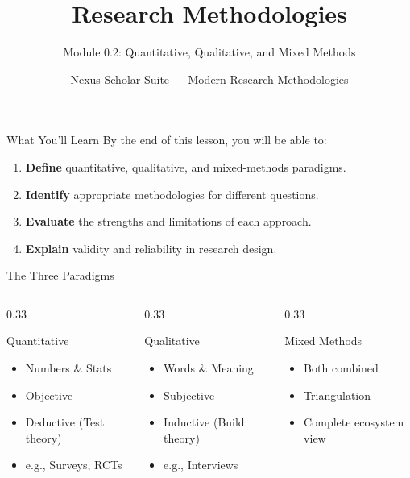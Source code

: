 \documentclass[aspectratio=169]{beamer}
\title{Research Methodologies}
\subtitle{Module 0.2: Quantitative, Qualitative, and Mixed Methods}
\author{Nexus Scholar Suite --- Modern Research Methodologies}
\date{}
\begin{document}
\begin{frame}[plain]
  \titlepage
\end{frame}

\begin{frame}{What You'll Learn}
  By the end of this lesson, you will be able to:
  \begin{enumerate}
    \item \textbf{Define} quantitative, qualitative, and mixed-methods paradigms.
    \item \textbf{Identify} appropriate methodologies for different questions.
    \item \textbf{Evaluate} the strengths and limitations of each approach.
    \item \textbf{Explain} validity and reliability in research design.
  \end{enumerate}
\end{frame}

\begin{frame}{The Three Paradigms}
  \begin{columns}[T]
    \begin{column}{0.33\textwidth}
      \begin{block}{Quantitative}
        \begin{itemize}
          \item Numbers \& Stats
          \item Objective
          \item Deductive (Test theory)
          \item e.g., Surveys, RCTs
        \end{itemize}
      \end{block}
    \end{column}
    \begin{column}{0.33\textwidth}
      \begin{exampleblock}{Qualitative}
        \begin{itemize}
          \item Words \& Meaning
          \item Subjective
          \item Inductive (Build theory)
          \item e.g., Interviews
        \end{itemize}
      \end{exampleblock}
    \end{column}
    \begin{column}{0.33\textwidth}
      \begin{alertblock}{Mixed Methods}
        \begin{itemize}
          \item Both combined
          \item Triangulation
          \item Complete ecosystem view
        \end{itemize}
      \end{alertblock}
    \end{column}
  \end{columns}
\end{frame}
\end{document}
